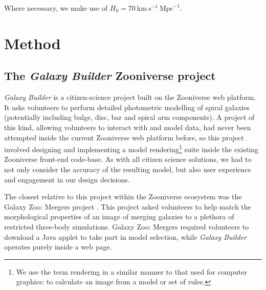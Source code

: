 \documentclass[trackchanges]{aastex63}
\begin{document}
Where necessary, we make use of $H_0 = 70\ \text{km}\ \text{s}^{-1}\ \text{Mpc}^{-1}$.


\section{Method}
\label{sec:method}

\begin{figure*}
  \caption{}
  \label{fig:gzb-flowchart}
\end{figure*}

\subsection{The \textit{Galaxy Builder} Zooniverse project}

\textit{Galaxy Builder} is a citizen-science project built on the Zooniverse web platform. It asks volunteers to perform detailed photometric modelling of spiral galaxies (potentially including bulge, disc, bar and spiral arm components). A project of this kind, allowing volunteers to interact with and model data, had never been attempted inside the current Zooniverse web platform before, so this project involved designing and implementing a model rendering\footnote{We use the term rendering in a similar manner to that used for computer graphics: to calculate an image from a model or set of rules.} suite inside the existing Zooniverse front-end code-base. As with all citizen science solutions, we had to not only consider the accuracy of the resulting model, but also user experience and engagement in our design decisions.

The closest relative to this project within the Zooniverse ecosystem was the Galaxy Zoo: Mergers project \citep{Holincheck2016:1604.00435v1}. This project asked volunteers to help match the morphological properties of an image of merging galaxies to a plethora of restricted three-body simulations. Galaxy Zoo: Mergers required volunteers to download a Java applet to take part in model selection, while \textit{Galaxy Builder} operates purely inside a web page.
\end{document}
